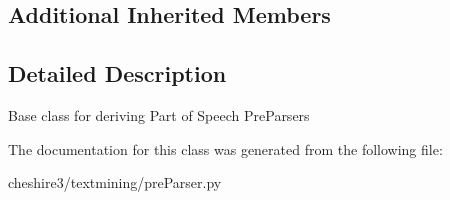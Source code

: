 \subsection*{Additional Inherited Members}


\subsection{Detailed Description}
\begin{DoxyVerb}Base class for deriving Part of Speech PreParsers \end{DoxyVerb}
 

The documentation for this class was generated from the following file\-:\begin{DoxyCompactItemize}
\item 
cheshire3/textmining/pre\-Parser.\-py\end{DoxyCompactItemize}
